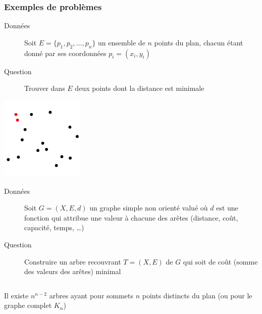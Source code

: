 \documentclass[aspectratio=1610,francais,envcountsect]{beamer}
\begin{document}
\begin{frame}[allowframebreaks]
  \frametitle{Exemples de problèmes}

  \begin{definition}

    \begin{description}
    \item[Données] Soit $E = \{p_1, p_2, \ldots , p_n\}$ un ensemble
      de $n$ points du plan, chacun étant donné par ses coordonnées
      $p_i = (x_i, y_i)$
    \item[Question] Trouver dans $E$ deux points dont la distance est
      minimale
    \end{description}
  \end{definition}

  \begin{center}
    \includegraphics[height=4cm]{p4.png}
  \end{center}


  \framebreak

  \begin{definition}

    \begin{description}
    \item[Données] Soit $G = (X, E, d)$ un graphe simple non orienté
      valué où $d$ est une fonction qui attribue une valeur à chacune
      des arêtes (distance, coût, capacité, temps, \ldots)
    \item [Question] Construire un arbre recouvrant $T = (X, E)$ de
      $G$ qui soit de coût (somme des valeurs des arêtes) minimal
    \end{description}
  \end{definition}

  \begin{columns}
    \begin{column}{0.5\columnwidth}
      \begin{theorem}[Cayley, 1897]
        Il existe $n^{n - 2}$ arbres ayant pour sommets $n$ points
        distincts du plan (ou pour le graphe complet $K_n$)
      \end{theorem}
    \end{column}


\end{columns}
\end{frame}
\end{document}
